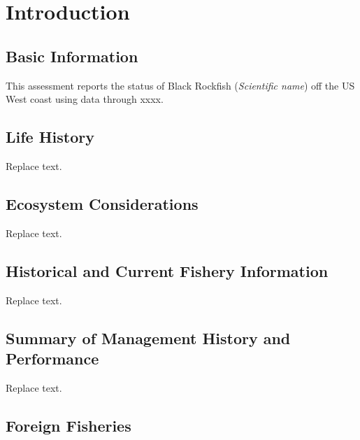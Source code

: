 \documentclass[11pt,
  english,
  letterpaper,
]{article}
\begin{document}
\pagebreak
\setlength{\parskip}{5mm plus1mm minus1mm}
\setcounter{page}{1}
\renewcommand{\thefigure}{\arabic{figure}}
\renewcommand{\thetable}{\arabic{table}}
\setcounter{table}{0}
\setcounter{figure}{0}

\hypertarget{introduction}{%
\section{Introduction}\label{introduction}}

\hypertarget{basic-information}{%
\subsection{Basic Information}\label{basic-information}}

This assessment reports the status of Black Rockfish (\emph{Scientific name}) off the US West coast using data through xxxx.

\hypertarget{life-history}{%
\subsection{Life History}\label{life-history}}

Replace text.

\hypertarget{ecosystem-considerations-1}{%
\subsection{Ecosystem Considerations}\label{ecosystem-considerations-1}}

Replace text.

\hypertarget{historical-and-current-fishery-information}{%
\subsection{Historical and Current Fishery Information}\label{historical-and-current-fishery-information}}

Replace text.

\hypertarget{summary-of-management-history-and-performance}{%
\subsection{Summary of Management History and Performance}\label{summary-of-management-history-and-performance}}

Replace text.

\hypertarget{foreign-fisheries}{%
\subsection{Foreign Fisheries}\label{foreign-fisheries}}
\end{document}
